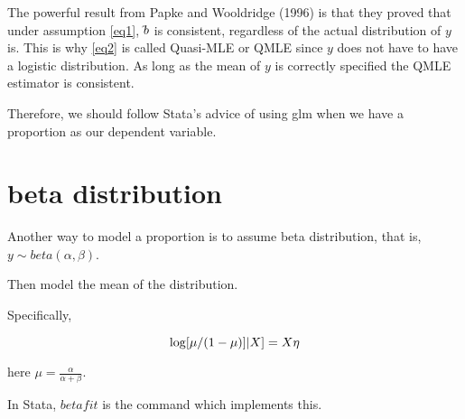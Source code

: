 The powerful result from Papke and Wooldridge (1996) is that they proved that under assumption \ref{eq1}, $\hat \bf b $ is consistent, regardless of the actual distribution of $y$ is.  This is why \ref{eq2} is called Quasi-MLE or QMLE since $y$ does not have to have a logistic distribution.  As long as the mean of $y$ is correctly specified the QMLE estimator is consistent.

Therefore, we should follow Stata's advice of using glm when we have a proportion as our dependent variable.

\section{beta distribution}

Another way to model a proportion is to assume beta distribution, that
is, $y \sim beta(\alpha, \beta)$.

Then model the mean of the distribution.

Specifically,

\[  { \rm log} [\mu /(1- \mu)] | X ]= X \eta\]

here $\mu = \frac{\alpha}{\alpha + \beta}$.  

In Stata, $betafit$ is the command which implements this.
